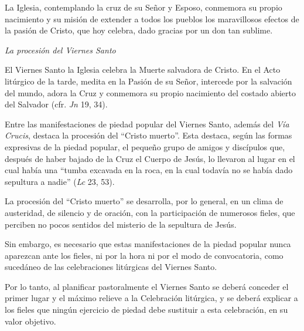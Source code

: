 			\begin{bodyintro}La Iglesia, contemplando la cruz de su Señor y Esposo, conmemora su propio nacimiento y su misión de extender a todos los pueblos los maravillosos efectos de la pasión de Cristo, que hoy celebra, dado gracias por un don tan sublime.\end{bodyintro}
			
			\begin{bodyintro}\textit{La procesión del Viernes Santo}\end{bodyintro}
			
			\begin{bodyintro}El Viernes Santo la Iglesia celebra la Muerte salvadora de Cristo. En el Acto litúrgico de la tarde, medita en la Pasión de su Señor, intercede por la salvación del mundo, adora la Cruz y conmemora su propio nacimiento del costado abierto del Salvador (cfr. \textit{Jn} 19, 34).\end{bodyintro}
			
			\begin{bodyintro}Entre las manifestaciones de piedad popular del Viernes Santo, además del \textit{Vía Crucis}, destaca la procesión del “Cristo muerto”. Esta destaca, según las formas expresivas de la piedad popular, el pequeño grupo de amigos y discípulos que, después de haber bajado de la Cruz el Cuerpo de Jesús, lo llevaron al lugar en el cual había una “tumba excavada en la roca, en la cual todavía no se había dado sepultura a nadie” (\textit{Lc} 23, 53).\end{bodyintro}
			
			\begin{bodyintro}La procesión del “Cristo muerto” se desarrolla, por lo general, en un clima de austeridad, de silencio y de oración, con la participación de numerosos fieles, que perciben no pocos sentidos del misterio de la sepultura de Jesús.\end{bodyintro}
			
			\begin{bodyintro}Sin embargo, es necesario que estas manifestaciones de la piedad popular nunca aparezcan ante los fieles, ni por la hora ni por el modo de convocatoria, como sucedáneo de las celebraciones litúrgicas del Viernes Santo.\end{bodyintro}
			
			\begin{bodyintro}Por lo tanto, al planificar pastoralmente el Viernes Santo se deberá conceder el primer lugar y el máximo relieve a la Celebración litúrgica, y se deberá explicar a los fieles que ningún ejercicio de piedad debe sustituir a esta celebración, en su valor objetivo.\end{bodyintro}
			
